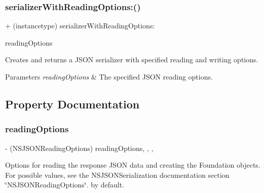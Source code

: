 \subsubsection{\texorpdfstring{serializer\+With\+Reading\+Options\+:()}{serializerWithReadingOptions:()}\hspace{0.1cm}{\footnotesize\ttfamily [3/3]}}
{\footnotesize\ttfamily + (instancetype) serializer\+With\+Reading\+Options\+: \begin{DoxyParamCaption}\item[{(N\+S\+J\+S\+O\+N\+Reading\+Options)}]{reading\+Options }\end{DoxyParamCaption}}

Creates and returns a J\+S\+ON serializer with specified reading and writing options.


\begin{DoxyParams}{Parameters}
{\em reading\+Options} & The specified J\+S\+ON reading options. \\
\hline
\end{DoxyParams}


\subsection{Property Documentation}
\mbox{\label{interface_a_f_j_s_o_n_response_serializer_a344e139d77d63a22446f3c95990d2bce}} 
\subsubsection{\texorpdfstring{reading\+Options}{readingOptions}}
{\footnotesize\ttfamily -\/ (N\+S\+J\+S\+O\+N\+Reading\+Options) reading\+Options\hspace{0.3cm}{\ttfamily [read]}, {\ttfamily [write]}, {\ttfamily [nonatomic]}, {\ttfamily [assign]}}

Options for reading the response J\+S\+ON data and creating the Foundation objects. For possible values, see the {\ttfamily N\+S\+J\+S\+O\+N\+Serialization} documentation section \char`\"{}\+N\+S\+J\+S\+O\+N\+Reading\+Options\char`\"{}. {} by default. \mbox{\label{interface_a_f_j_s_o_n_response_serializer_af7be2fbd6e630440952f10bf448569aa}} 
